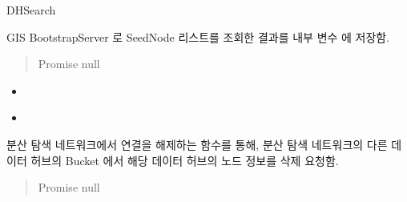 \documentclass[a4paper,10pt,english]{sphinxmanual}
\begin{document}
\begin{fulllineitems}
\label{\detokenize{_DHSearch:DHSearch}}
\pysigstartsignatures
{}
\pysigstopsignatures
\sphinxAtStartPar
DHSearch

\begin{fulllineitems}
\label{\detokenize{_DHSearch:DHSearch._bootstrapProcess}}
\pysigstartsignatures
{}
\pysigstopsignatures
\sphinxAtStartPar
GIS BootstrapServer 로 SeedNode 리스트를 조회한 결과를 내부 변수  에 저장함.
\begin{quote}\begin{description}
\sphinxAtStartPar
Promise \sphinxhyphen{} null

\end{description}\end{quote}


\nopagebreak

\begin{itemize}
\item {} 
\sphinxAtStartPar
{\hyperref[\detokenize{_DHSearch:DHSearch.run}]{}}

\item {} 
\sphinxAtStartPar
{\hyperref[\detokenize{_DHSearch:DHSearch.getSeedNode}]{}}

\end{itemize}



\end{fulllineitems}


\begin{fulllineitems}
\label{\detokenize{_DHSearch:DHSearch._deleteMyInfoFromKademlia}}
\pysigstartsignatures
{}
\pysigstopsignatures
\sphinxAtStartPar
분산 탐색 네트워크에서 연결을 해제하는 {\hyperref[\detokenize{_kademlia:kademlia}]{}}  함수를 통해,
분산 탐색 네트워크의 다른 데이터 허브의 Bucket 에서 해당 데이터 허브의 노드 정보를 삭제 요청함.
\begin{quote}\begin{description}
\sphinxAtStartPar
Promise \sphinxhyphen{} null


\end{description}
\end{quote}
\end{fulllineitems}
\end{fulllineitems}
\end{document}
